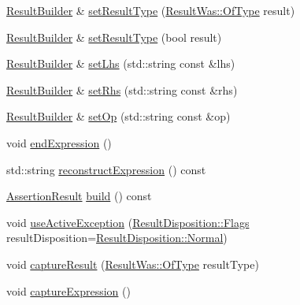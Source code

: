 \begin{DoxyCompactItemize}
\item 
\hyperlink{class_catch_1_1_result_builder}{Result\+Builder} \& \hyperlink{class_catch_1_1_result_builder_af896e372db9d7fc90ddeceff3ad110d0}{set\+Result\+Type} (\hyperlink{struct_catch_1_1_result_was_a624e1ee3661fcf6094ceef1f654601ef}{Result\+Was\+::\+Of\+Type} result)
\item 
\hyperlink{class_catch_1_1_result_builder}{Result\+Builder} \& \hyperlink{class_catch_1_1_result_builder_ae504348b073d0360bfd5fc33347ec689}{set\+Result\+Type} (bool result)
\item 
\hyperlink{class_catch_1_1_result_builder}{Result\+Builder} \& \hyperlink{class_catch_1_1_result_builder_a5de584deec90fc6b7cc5bcf9eb636442}{set\+Lhs} (std\+::string const \&lhs)
\item 
\hyperlink{class_catch_1_1_result_builder}{Result\+Builder} \& \hyperlink{class_catch_1_1_result_builder_aaeb41a00cf352c7a0bcf75a0ded0a4a2}{set\+Rhs} (std\+::string const \&rhs)
\item 
\hyperlink{class_catch_1_1_result_builder}{Result\+Builder} \& \hyperlink{class_catch_1_1_result_builder_a8232ed051ed7f6adfbc152c98aa1dc0c}{set\+Op} (std\+::string const \&op)
\item 
void \hyperlink{class_catch_1_1_result_builder_a75ac2dbabd8d4b4b3a75de9bbc3abf02}{end\+Expression} ()
\item 
std\+::string \hyperlink{class_catch_1_1_result_builder_aebe098f8d206a89995076b95a3348195}{reconstruct\+Expression} () const
\item 
\hyperlink{class_catch_1_1_assertion_result}{Assertion\+Result} \hyperlink{class_catch_1_1_result_builder_a4fc96e7bb8b5f7119a8e79692ec97808}{build} () const
\item 
void \hyperlink{class_catch_1_1_result_builder_a5bbd2f14a678f3e8d0f791ac6d233d65}{use\+Active\+Exception} (\hyperlink{struct_catch_1_1_result_disposition_a3396cad6e2259af326b3aae93e23e9d8}{Result\+Disposition\+::\+Flags} result\+Disposition=\hyperlink{struct_catch_1_1_result_disposition_a3396cad6e2259af326b3aae93e23e9d8af3bd52347ed6f8796e8ce2f77bb39ea5}{Result\+Disposition\+::\+Normal})
\item 
void \hyperlink{class_catch_1_1_result_builder_a10e467f7b7a4976e5d148b4d5066e8fd}{capture\+Result} (\hyperlink{struct_catch_1_1_result_was_a624e1ee3661fcf6094ceef1f654601ef}{Result\+Was\+::\+Of\+Type} result\+Type)
\item 
void \hyperlink{class_catch_1_1_result_builder_af2ae2343965802eeeb0abbd4ea9d2d36}{capture\+Expression} ()
\item 

\end{DoxyCompactItemize}
